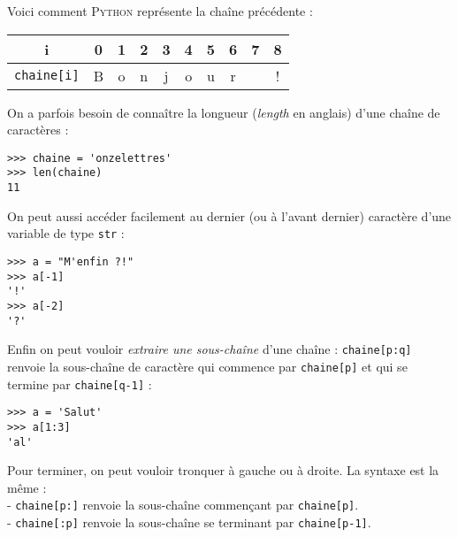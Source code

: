 Voici comment \textsc{Python} représente  la chaîne précédente :

\begin{center}
    \alternaterowcolors
    \begin{tabular}{|c|c|c|c|c|c|c|c|c|c|}
        \hline
        i                        & 0 & 1 & 2 & 3 & 4 & 5 & 6 & 7 & 8 \\
        \hline
        \texttt{chaine[i]} & B & o & n & j & o & u & r &   & ! \\
        \hline
    \end{tabular}
\end{center}

On a parfois besoin de connaître la longueur (\emph{length} en anglais) d'une chaîne de caractères :

\begin{pyc}\begin{verbatim}
>>> chaine = 'onzelettres'
>>> len(chaine)
11
\end{verbatim}
\end{pyc}

On peut aussi accéder facilement au dernier (ou à l'avant dernier) caractère d'une variable de type \texttt{str} :

\begin{pyc}\begin{verbatim}
>>> a = "M'enfin ?!"
>>> a[-1]
'!'
>>> a[-2]
'?'
\end{verbatim}
\end{pyc}

Enfin on peut vouloir \textit{extraire une sous-chaîne} d'une chaîne : \texttt{chaine[p:q]} renvoie la sous-chaîne de caractère qui commence par
\texttt{chaine[p]} et qui se termine par \texttt{chaine[q-1]} :

\begin{pyc}\begin{verbatim}
>>> a = 'Salut'
>>> a[1:3]
'al'
\end{verbatim}
\end{pyc}

Pour terminer, on peut vouloir tronquer à gauche ou à droite. La syntaxe est la même :\\
- \texttt{chaine[p:]} renvoie la sous-chaîne commençant par \texttt{chaine[p]}.\\
-  \texttt{chaine[:p]} renvoie la sous-chaîne se terminant par \texttt{chaine[p-1]}.

